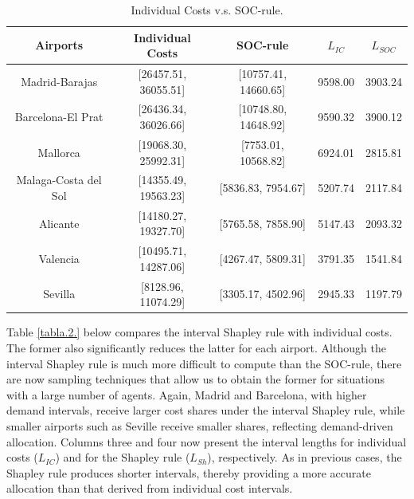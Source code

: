 \documentclass[12pt]{article}
\begin{document}
 \begin{table}[h]
    \centering
    \begin{tabular}{c|c|c|c|c|}
        \textbf{Airports} &\textbf{Individual Costs} &\textbf{SOC-rule} & \textbf{$L_{IC}$} & \textbf{$L_{SOC}$} \\ \hline
         Madrid-Barajas &  [26457.51, 36055.51] & [10757.41, 14660.65] & 9598.00 & 3903.24 \\
        Barcelona-El Prat &  [26436.34, 36026.66] & [10748.80, 14648.92]  & 9590.32&  3900.12 \\
         Mallorca &  [19068.30, 25992.31]  & [7753.01, 10568.82] & 6924.01 & 2815.81 \\
         Malaga-Costa del Sol &  [14355.49, 19563.23] & [5836.83, 7954.67]  & 5207.74 & 2117.84 \\
             Alicante &  [14180.27, 19327.70]  & [5765.58, 7858.90] & 5147.43 & 2093.32  \\
         Valencia &  [10495.71, 14287.06] & [4267.47, 5809.31] & 3791.35 &  1541.84 \\
         Sevilla &  [8128.96, 11074.29]  & [3305.17, 4502.96] & 2945.33 &  1197.79 \\
    \end{tabular}
    \caption{Individual Costs v.s. SOC-rule.}
    \label{tabla.1.}
\end{table}

Table \ref{tabla.2.} below compares the interval Shapley rule with individual costs. The former also significantly
reduces the latter for each airport. Although the interval Shapley rule is much more difficult to compute than the SOC-rule, there are now sampling techniques that allow us to obtain the former for situations with a large number of agents. Again, Madrid and Barcelona, with higher demand intervals, receive larger cost shares under the interval Shapley rule, while smaller airports such as Seville receive smaller shares, reflecting demand-driven allocation. Columns three and four now present the interval lengths for individual costs ($L_{IC}$)
 and for the Shapley rule ($L_{Sh}$), respectively. As in previous cases, the Shapley rule produces shorter intervals, thereby providing a more accurate allocation than that derived from individual cost intervals.
\end{document}
